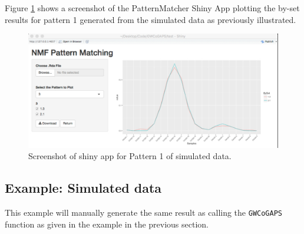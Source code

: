 \documentclass{report}
\begin{document}
Figure \ref{fig:App1} shows a screenshot of the PatternMatcher Shiny App plotting the by-set results for pattern 1 generated from the simulated data as previously illustrated.
\begin{figure}[ht]
\begin{center}
\includegraphics[width=0.95\linewidth]{ShinyApp}
\end{center}
\caption{Screenshot of shiny app for Pattern 1 of simulated data.}
\label{fig:App1}
\end{figure}

\subsection{Example: Simulated data}

\par This example will manually generate the same result as calling the \texttt{GWCoGAPS} function as given in the example in the previous section.
\end{document}

